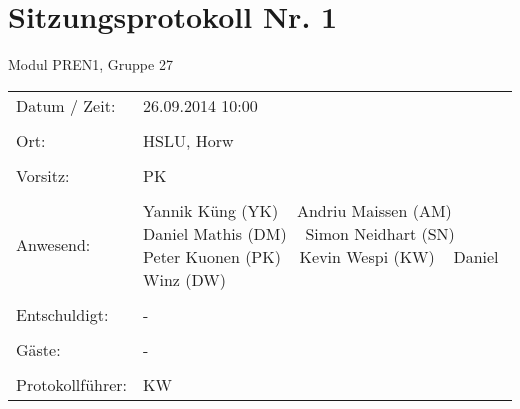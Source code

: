 \documentclass[a4paper,10pt,fleqn]{article}
\begin{document}
\section*{Sitzungsprotokoll Nr. 1}
Modul PREN1, Gruppe 27

\begin{longtable}[l]{@{}p{}@{}p{}@{}}
    Datum / Zeit: &
        26.09.2014 10:00
        \\\\
    Ort: &
        HSLU, Horw
        \\\\
    Vorsitz: &
        PK
        \\\\
    Anwesend: &
        Yannik Küng (YK) ~
        Andriu Maissen (AM) ~
        Daniel Mathis (DM) ~
        Simon Neidhart (SN) ~
        Peter Kuonen (PK) ~
        Kevin Wespi (KW) ~
        Daniel Winz (DW) ~
        \\\\
    Entschuldigt: &
        - ~
        \\\\
    Gäste: &
        - ~
        \\\\
    Protokollführer: &
        KW
        \\
\end{longtable}
%
\end{document}
